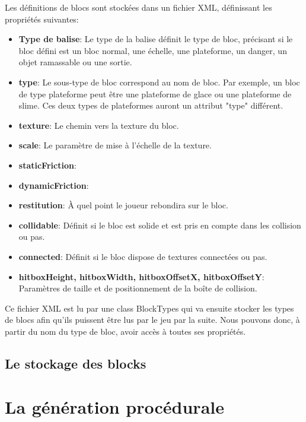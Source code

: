\documentclass[10pt]{report}
\begin{document}
Les définitions de blocs sont stockées dans un fichier XML, définissant les propriétés suivantes:
\begin{itemize}
  \item \textbf{Type de balise}: Le type de la balise définit le type de bloc, précisant si le bloc défini
  est un bloc normal, une échelle, une plateforme, un danger, un objet ramassable ou une sortie.
  \item \textbf{type}: Le sous-type de bloc correspond au nom de bloc.
  Par exemple, un bloc de type plateforme peut être une plateforme de glace ou une plateforme de slime.
  Ces deux types de plateformes auront un attribut "type" différent.
  \item \textbf{texture}: Le chemin vers la texture du bloc.
  \item \textbf{scale}: Le paramètre de mise à l'échelle de la texture.
  \item \textbf{staticFriction}: %
  \item \textbf{dynamicFriction}:
  \item \textbf{restitution}: À quel point le joueur rebondira sur le bloc.
  \item \textbf{collidable}: Définit si le bloc est solide et est pris en compte dans les collision ou pas.
  \item \textbf{connected}: Définit si le bloc dispose de textures connectées ou pas.
  \item \textbf{hitboxHeight, hitboxWidth, hitboxOffsetX, hitboxOffsetY}: Paramètres de taille et de positionnement
  de la boîte de collision.
\end{itemize}

Ce fichier XML est lu par une class BlockTypes qui va ensuite stocker les types de blocs afin qu'ils puissent
être lus par le jeu par la suite.
Nous pouvons donc, à partir du nom du type de bloc, avoir accès à toutes ses propriétés.
  
\subsection{Le stockage des blocks}

\section{La génération procédurale}
\end{document}
